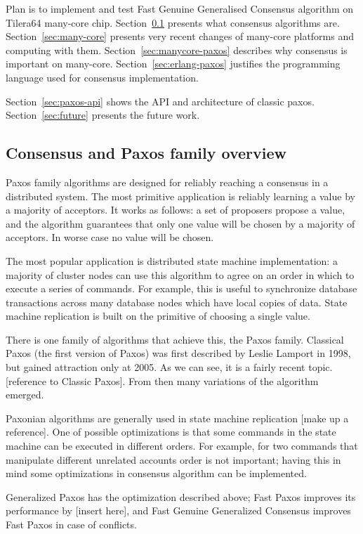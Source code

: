 \documentclass[english,11pt]{article}
\begin{document}
Plan is to implement and test Fast Genuine Generalised Consensus algorithm on
Tilera64 many-core chip. Section~\ref{sec:paxos-family} presents what consensus
algorithms are. Section~\ref{sec:many-core} presents very recent changes of
many-core platforms and computing with them. Section~\ref{sec:manycore-paxos}
describes why consensus is important on many-core.
Section~\ref{sec:erlang-paxos} justifies the programming language used for
consensus implementation.

Section~\ref{sec:paxos-api} shows the API and architecture of classic paxos.
Section~\ref{sec:future} presents the future work.

\subsection{Consensus and Paxos family overview}
\label{sec:paxos-family}

Paxos family algorithms are designed for reliably reaching a consensus in a
distributed system. The most primitive application is reliably learning a value
by a majority of acceptors. It works as follows: a set of proposers propose a
value, and the algorithm guarantees that only one value will be chosen by a
majority of acceptors. In worse case no value will be chosen.

The most popular application is distributed state machine implementation: a
majority of cluster nodes can use this algorithm to agree on an order in which
to execute a series of commands. For example, this is useful to synchronize
database transactions across many database nodes which have local copies of
data. State machine replication is built on the primitive of choosing a single
value.

There is one family of algorithms that achieve this, the Paxos family.
Classical Paxos (the first version of Paxos) was first described by Leslie
Lamport in 1998, but gained attraction only at 2005. As we can see, it is a
fairly recent topic. [reference to Classic Paxos]. From then many variations of
the algorithm emerged.

Paxonian algorithms are generally used in state machine replication [make up a
reference]. One of possible optimizations is that some commands in the state
machine can be executed in different orders. For example, for two commands that
manipulate different unrelated accounts order is not important; having this in
mind some optimizations in consensus algorithm can be implemented.

Generalized Paxos has the optimization described above; Fast Paxos improves its
performance by [insert here], and Fast Genuine Generalized Consensus improves
Fast Paxos in case of conflicts.
\end{document}
